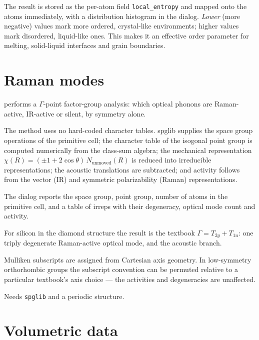 The result is stored as the per-atom field \texttt{local\_entropy} and
mapped onto the atoms immediately, with a distribution histogram in the
dialog. \emph{Lower} (more negative) values mark more ordered,
crystal-like environments; higher values mark disordered, liquid-like ones.
This makes it an effective order parameter for melting, solid-liquid
interfaces and grain boundaries.

\section{Raman modes}

\menusep{} performs a $\Gamma$-point
factor-group analysis: which optical phonons are Raman-active, IR-active or
silent, by symmetry alone.

The method uses no hard-coded character tables. spglib supplies the space
group operations of the primitive cell; the character table of the isogonal
point group is computed numerically from the class-sum algebra; the
mechanical representation $\chi(R) = (\pm 1 + 2\cos\theta)\,N_\text{unmoved}(R)$
is reduced into irreducible representations; the acoustic translations are
subtracted; and activity follows from the vector (IR) and symmetric
polarizability (Raman) representations.

The dialog reports the space group, point group, number of atoms in the
primitive cell, and a table of irreps with their degeneracy, optical mode
count and activity.

\begin{caltip}
For silicon in the diamond structure the result is the textbook
$\Gamma = T_{2g} + T_{1u}$: one triply degenerate Raman-active optical
mode, and the acoustic branch.
\end{caltip}

\begin{calnote}
Mulliken subscripts are assigned from Cartesian axis geometry. In
low-symmetry orthorhombic groups the subscript convention can be permuted
relative to a particular textbook's axis choice --- the activities and
degeneracies are unaffected.
\end{calnote}

\begin{calwarn}
Needs \texttt{spglib} and a periodic structure.
\end{calwarn}

\section{Volumetric data}
\label{sec:volumetric}

